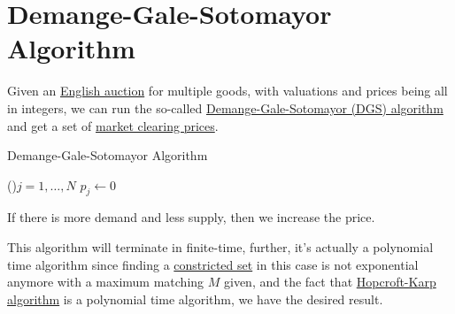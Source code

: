 \section{Demange-Gale-Sotomayor Algorithm}
Given an \hyperref[eg:English-auction]{English auction} for multiple goods, with valuations and prices being all in integers, we can run the so-called \hyperref[algo:Demange-Gale-Sotomayor-algorithm]{Demange-Gale-Sotomayor (DGS) algorithm} and get a set of \hyperref[note:market-clearing-prices]{market clearing prices}.

\begin{algorithm}[H]\label{algo:Demange-Gale-Sotomayor-algorithm}
	\DontPrintSemicolon
	\caption{Demange-Gale-Sotomayor Algorithm}
	\BlankLine

	\For(){\(j = 1, \ldots  , N\)}{
		\(p_j\gets 0\)\;
	}
	\;
\end{algorithm}

\begin{intuition}
	If there is more demand and less supply, then we increase the price.
\end{intuition}

\begin{remark}
	This algorithm will terminate in finite-time, further, it's actually a polynomial time algorithm since finding a \hyperref[def:constricted-set]{constricted set} in this case is not exponential anymore with a maximum matching \(M\) given, and the fact that \hyperref[algo:Hopcroft-Karp-algorithm]{Hopcroft-Karp algorithm} is a polynomial time algorithm, we have the desired result.
\end{remark}

